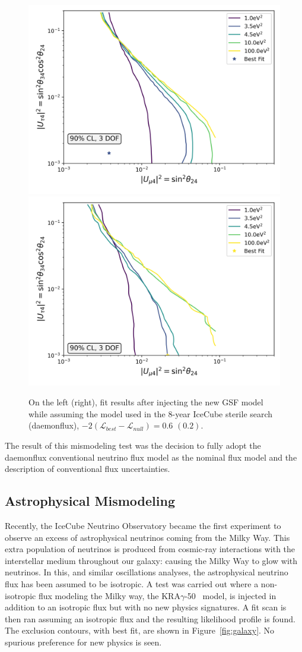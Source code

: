 \documentclass[main.tex]{subfiles}
\begin{document}
\begin{figure}  
    \centering
    \includegraphics[width=0.45\linewidth]{figures/gsfinject_fitbarr_Realization_gsfdaemon_Asimov_sterile_0_cl0.9_dof3.png}
    \includegraphics[width=0.45\linewidth]{figures/gsfinject_fitdaemon_Realization_gsfdaemon_Asimov_sterile_0_cl0.9_dof3.png}
    \caption{On the left (right), fit results after injecting the new GSF model while assuming the model used in the 8-year IceCube sterile search (daemonflux), $-2(\mathcal{L}_{best}-\mathcal{L}_{null})=0.6$ $(0.2)$.}\label{fig:gsf_updates}
\end{figure}

The result of this mismodeling test was the decision to fully adopt the daemonflux conventional neutrino flux model as the nominal flux model and the description of conventional flux uncertainties. 

\subsection{Astrophysical Mismodeling}

Recently, the IceCube Neutrino Observatory became the first experiment to observe an excess of astrophysical neutrinos coming from the Milky Way\cite{doi:10.1126/science.adc9818}. 
This extra population of neutrinos is produced from cosmic-ray interactions with the interstellar medium throughout our galaxy: causing the Milky Way to glow with neutrinos. 
In this, and similar oscillations analyses, the astrophysical neutrino flux has been assumed to be isotropic. 
A test was carried out where a non-isotropic flux modeling the Milky way, the KRA$\gamma$-50~\cite{Gaggero_2015} model, is injected in addition to an isotropic flux but with no new physics signatures. 
A fit scan is then ran assuming an isotropic flux and the resulting likelihood profile is found. 
The exclusion contours, with best fit, are shown in Figure~\ref{fig:galaxy}.
No spurious preference for new physics is seen. 
\end{document}
